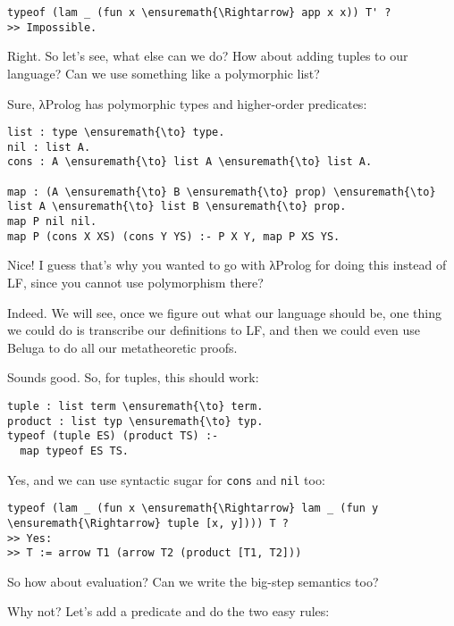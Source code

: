 \begin{verbatim}
typeof (lam _ (fun x \ensuremath{\Rightarrow} app x x)) T' ?
>> Impossible.
\end{verbatim}

\heroSTUDENT{} Right. So let's see, what else can we do? How about adding
tuples to our language? Can we use something like a polymorphic list?

\heroADVISOR{} Sure, \foreignlanguage{greek}{λ}Prolog has polymorphic types and higher-order
predicates:

\begin{verbatim}
list : type \ensuremath{\to} type.
nil : list A.
cons : A \ensuremath{\to} list A \ensuremath{\to} list A.

map : (A \ensuremath{\to} B \ensuremath{\to} prop) \ensuremath{\to} list A \ensuremath{\to} list B \ensuremath{\to} prop.
map P nil nil.
map P (cons X XS) (cons Y YS) :- P X Y, map P XS YS.
\end{verbatim}

\heroSTUDENT{} Nice! I guess that's why you wanted to go with \foreignlanguage{greek}{λ}Prolog for
doing this instead of LF, since you cannot use polymorphism there?

\heroADVISOR{} Indeed. We will see, once we figure out what our language
should be, one thing we could do is transcribe our definitions to LF,
and then we could even use Beluga \citep{pientka2008programming} to do
all our metatheoretic proofs.

\heroSTUDENT{} Sounds good. So, for tuples, this should work:

\begin{verbatim}
tuple : list term \ensuremath{\to} term.
product : list typ \ensuremath{\to} typ.
typeof (tuple ES) (product TS) :-
  map typeof ES TS.
\end{verbatim}

\heroADVISOR{} Yes, and we can use syntactic sugar for \texttt{cons} and
\texttt{nil} too:

\begin{verbatim}
typeof (lam _ (fun x \ensuremath{\Rightarrow} lam _ (fun y \ensuremath{\Rightarrow} tuple [x, y]))) T ?
>> Yes:
>> T := arrow T1 (arrow T2 (product [T1, T2]))
\end{verbatim}

\heroSTUDENT{} So how about evaluation? Can we write the big-step semantics
too?

\heroADVISOR{} Why not? Let's add a predicate and do the two easy rules:

